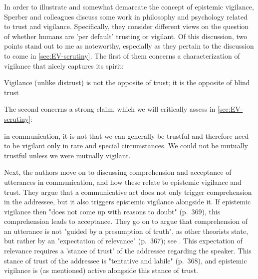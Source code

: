 In order to illustrate and somewhat demarcate the concept of epistemic vigilance, Sperber and colleagues discuss some work in philosophy and psychology related to trust and vigilance. Specifically, they consider different views on the question of whether humans are 'per default' trusting or vigilant.
Of this discussion, two points stand out to me as noteworthy, especially as they pertain to the discussion to come in \cref{sec:EV-scrutiny}. The first of them concerns a characterization of vigilance that nicely captures its spirit:
\begin{quoting}
    Vigilance (unlike distrust) is not the opposite of trust; it is the opposite
of blind trust
    \hfill \citep[p.~363]{Sperber10}
\end{quoting}
The second concerns a strong claim, which we will critically assess in \cref{sec:EV-scrutiny}:
\begin{quoting}
    in communication, it is not that we can generally be trustful and therefore need to be vigilant only in rare and special circumstances. We could not be mutually trustful unless we were mutually vigilant.
    \hfill \citep[p.~364]{Sperber10}
\end{quoting}

Next, the authors move on to discussing comprehension and acceptance of utterances in communication, and how these relate to epistemic vigilance and trust.
They argue that a communicative act does not only trigger comprehension in the addressee, but it also triggers epistemic vigilance alongside it. If epistemic vigilance then "does not come up with reasons to doubt" (p.~369), this comprehension leads to acceptance.
They go on to argue that comprehension of an utterance is not "guided by a presumption of truth", as other theorists state, but rather by an "expectation of relevance" (p.~367); see \citet{SperberWilson86}. This expectation of relevance requires a 'stance of trust' of the addressee regarding the speaker.
This stance of trust of the addressee is "tentative and labile" (p.~368), and epistemic vigilance is (as mentioned) active alongside this stance of trust.


